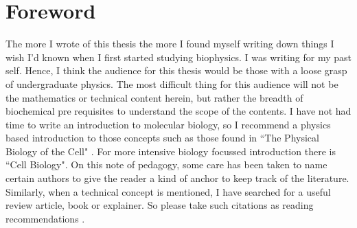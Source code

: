 \chapter*{Foreword}
\label{chap:foreword}
 {}

The more I wrote of this thesis the more I found myself writing down things I wish I'd known when I first started studying biophysics. I was writing for my past self. Hence, I think the audience for this thesis would be those with a loose grasp of undergraduate physics. The most difficult thing for this audience will not be the mathematics or technical content herein, but rather the breadth of biochemical pre requisites to understand the scope of the contents. I have not had time to write an introduction to molecular biology, so I recommend a physics based introduction to those concepts such as those found in ``The Physical Biology of the Cell" \cite{phillips2012}. For more intensive biology focussed introduction there is ``Cell Biology"\cite{pollard2016}. On this note of pedagogy, some care has been taken to name certain authors to give the reader a kind of anchor to keep track of the literature. Similarly, when a technical concept is mentioned, I have searched for a useful review article, book or explainer. So please take such citations as reading recommendations \cite{dawkins1989, hofstadter1999}.


